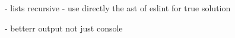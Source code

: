 - lists recursive
- use directly the ast of eslint for true solution

- betterr output not just console
